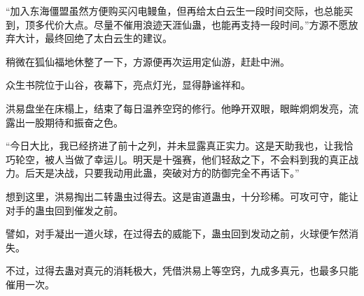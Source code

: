 \begin{this_body}
“加入东海僵盟虽然方便购买闪电鳗鱼，但再给太白云生一段时间交际，也总能买到，顶多代价大点。尽量不催用浪迹天涯仙蛊，也能再支持一段时间。”方源不愿放弃大计，最终回绝了太白云生的建议。

稍微在狐仙福地休整了一下，方源便再次运用定仙游，赶赴中洲。

众生书院位于山谷，夜幕下，亮点灯光，显得静谧祥和。

洪易盘坐在床榻上，结束了每日温养空窍的修行。他睁开双眼，眼眸炯炯发亮，流露出一股期待和振奋之色。

“今日大比，我已经挤进了前十之列，并未显露真正实力。这是天助我也，让我恰巧轮空，被人当做了幸运儿。明天是十强赛，他们轻敌之下，不会料到我的真正战力。后天是决战，只要我动用此蛊，突破对方的防御完全不再话下。”

想到这里，洪易掏出二转蛊虫过得去。这是宙道蛊虫，十分珍稀。可攻可守，能让对手的蛊虫回到催发之前。

譬如，对手凝出一道火球，在过得去的威能下，蛊虫回到发动之前，火球便乍然消失。

不过，过得去蛊对真元的消耗极大，凭借洪易上等空窍，九成多真元，也最多只能催用一次。

\end{this_body}

